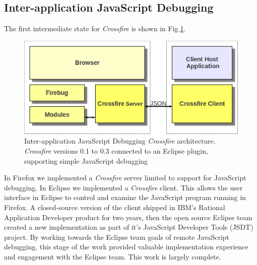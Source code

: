 \subsection{Inter-application JavaScript Debugging}
The first intermediate state for \textit{Crossfire} is shown in Fig.\ref{fig:fireclipse}.
\begin{figure}[htp]
  \includegraphics  [width = 86 mm] {figures/fireclipse.png}
  \caption{Inter-application JavaScript Debugging \textit{Crossfire} architecture.
\textit{Crossfire} versions 0.1 to 0.3 connected to an Eclipse plugin, supporting simple JavaScript debugging}
 \label{fig:fireclipse}
\end{figure}
In Firefox we implemented a \textit{Crossfire} server limited to support for JavaScript debugging.
In Eclipse we implemented a \textit{Crossfire} client. This allows the user interface in Eclipse to control
 and examine the JavaScript program running
in Firefox.  A closed-source version of the client shipped in IBM's Rational Application Developer product for two years,
then the open source Eclipse team created a new implementation as part of it's JavaScript Developer
Tools (JSDT) project\cite{EclipseJSDT}.  By working towards the Eclipse team
goals of remote JavaScript debugging, this stage of the work provided valuable implementation
experience and engagement with the Eclipse team.
This work is largely complete.


